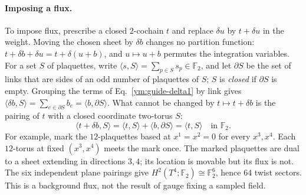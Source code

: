 \paragraph{Imposing a flux.}
To impose flux, prescribe a closed $2$-cochain $t$ and replace $\delta u$
by $t+\delta u$ in the weight. Moving the chosen sheet by $\delta b$
changes no partition function: $t+\delta b+\delta u=t+\delta(u+b)$, and
$u\mapsto u+b$ permutes the integration variables. For a set $S$ of
plaquettes, write $\langle s,S\rangle=\sum_{p\in S}s_p\in\mathbb F_2$, and
let $\partial S$ be the set of links that are sides of an odd number of
plaquettes of $S$; $S$ is \emph{closed} if $\partial S$ is empty. Grouping
the terms of Eq.~\eqref{ym:guide-delta1} by link gives
$\langle\delta b,S\rangle=\sum_{e\in\partial S}b_e=\langle b,\partial S\rangle$.
What cannot be changed by $t\mapsto t+\delta b$ is the pairing of $t$ with a
closed coordinate two-torus $S$:
\begin{equation}\label{ym:guide-flux-pairing}
 \langle t+\delta b,S\rangle=\langle t,S\rangle+\langle b,\partial S\rangle
 =\langle t,S\rangle\quad\text{in }\mathbb F_2.
\end{equation}
For example, mark the $12$-plaquettes based at $x^1=x^2=0$ for every
$x^3,x^4$. Each $12$-torus at fixed $(x^3,x^4)$ meets the mark once. The
marked plaquettes are dual to a sheet extending in directions $3,4$; its
location is movable but its flux is not. The six independent plane pairings
give $H^2(T^4;\mathbb F_2)\cong\mathbb F_2^6$, hence 64 twist sectors.
This is a background flux, not the result of gauge fixing a sampled field.

